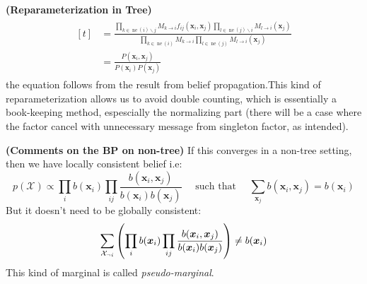 \begin{remark}{\textbf{(Reparameterization in Tree)}}
\begin{equation*}
\begin{aligned}
\begin{aligned}[t]
            &= \frac{\prod_{k \in \operatorname{ne}(i)\backslash j}M_{k\rightarrow i}f_{ij}(\boldsymbol x_i, \boldsymbol x_j)\prod_{l \in \operatorname{ne}(j)\backslash i}M_{l\rightarrow i}(\boldsymbol x_j)}{\prod_{k \in \operatorname{ne}(i)}M_{k\rightarrow i} \prod_{l \in \operatorname{ne}(j)}M_{l\rightarrow i}(\boldsymbol x_j) } \\
            &= \frac{P(\boldsymbol x_i, \boldsymbol x_j)}{P(\boldsymbol x_i)P(\boldsymbol x_j)}
        \end{aligned}
    \end{aligned}
    \end{equation*}
    the equation follows from the result from belief propagation.This kind of reparameterization allows us to avoid double counting, which is essentially a book-keeping method, espescially the normalizing part (there will be a case where the factor cancel with unnecessary message from singleton factor, as intended). 
\end{remark}

\begin{remark}{\textbf{(Comments on the BP on non-tree)}}
    If this converges in a non-tree setting, then we have locally consistent belief i.e:
    \begin{equation*}
        p(\mathcal{X}) \propto \prod_i b(\boldsymbol x_i) \prod_{ij}\frac{b(\boldsymbol x_i, \boldsymbol x_j)}{b(\boldsymbol x_i)b(\boldsymbol x_j)} \quad \text{ such that } \quad \sum_{\boldsymbol x_j}b(\boldsymbol x_i, \boldsymbol x_j) = b(\boldsymbol x_i)
    \end{equation*}
    But it doesn't need to be globally consistent:
    \begin{equation*}
        \sum_{\mathcal{X}_{\neg i}}\left( \prod_i b(\boldsymbol x_i) \prod_{ij}\frac{b(\boldsymbol x_i, \boldsymbol x_j)}{b(\boldsymbol x_i)b(\boldsymbol x_j)} \right) \ne b(\boldsymbol x_i)
    \end{equation*}
    This kind of marginal is called \emph{pseudo-marginal}. 
\end{remark}

